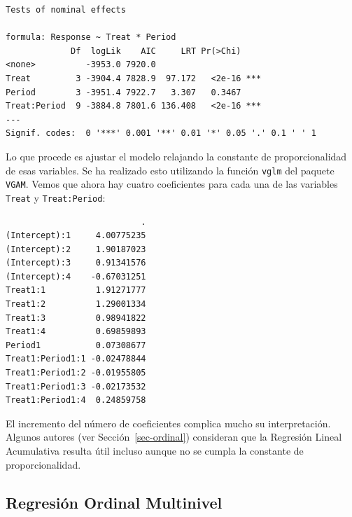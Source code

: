 \documentclass[
  12pt,
  a4paper,
  extrafontsizes,
  onecolumn,
  openright,
  table]{memoir}
\begin{document}
\scriptsize

\begin{verbatim}
Tests of nominal effects

formula: Response ~ Treat * Period
             Df  logLik    AIC     LRT Pr(>Chi)    
<none>          -3953.0 7920.0                     
Treat         3 -3904.4 7828.9  97.172   <2e-16 ***
Period        3 -3951.4 7922.7   3.307   0.3467    
Treat:Period  9 -3884.8 7801.6 136.408   <2e-16 ***
---
Signif. codes:  0 '***' 0.001 '**' 0.01 '*' 0.05 '.' 0.1 ' ' 1
\end{verbatim}

\normalsize

Lo que procede es ajustar el modelo relajando la constante de
proporcionalidad de esas variables. Se ha realizado esto utilizando la
función \texttt{vglm} del paquete \texttt{VGAM}. Vemos que ahora hay
cuatro coeficientes para cada una de las variables \texttt{Treat} y
\texttt{Treat:Period}:

\scriptsize

\begin{verbatim}
                           .
(Intercept):1     4.00775235
(Intercept):2     1.90187023
(Intercept):3     0.91341576
(Intercept):4    -0.67031251
Treat1:1          1.91271777
Treat1:2          1.29001334
Treat1:3          0.98941822
Treat1:4          0.69859893
Period1           0.07308677
Treat1:Period1:1 -0.02478844
Treat1:Period1:2 -0.01955805
Treat1:Period1:3 -0.02173532
Treat1:Period1:4  0.24859758
\end{verbatim}

\normalsize

El incremento del número de coeficientes complica mucho su
interpretación. Algunos autores (ver Sección~\ref{sec-ordinal})
consideran que la Regresión Lineal Acumulativa resulta útil incluso
aunque no se cumpla la constante de proporcionalidad.

\hypertarget{sec-multinivel-2}{%
\subsection{Regresión Ordinal Multinivel}\label{sec-multinivel-2}}
\end{document}

